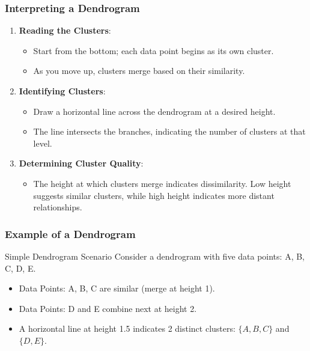 \documentclass[aspectratio=169]{beamer}
\begin{document}
\begin{frame}[fragile]
    \frametitle{Interpreting a Dendrogram}
    \begin{enumerate}
        \item \textbf{Reading the Clusters}:
        \begin{itemize}
            \item Start from the bottom; each data point begins as its own cluster.
            \item As you move up, clusters merge based on their similarity.
        \end{itemize}
        
        \item \textbf{Identifying Clusters}:
        \begin{itemize}
            \item Draw a horizontal line across the dendrogram at a desired height. 
            \item The line intersects the branches, indicating the number of clusters at that level.
        \end{itemize}
        
        \item \textbf{Determining Cluster Quality}:
        \begin{itemize}
            \item The height at which clusters merge indicates dissimilarity. Low height suggests similar clusters, while high height indicates more distant relationships.
        \end{itemize}
    \end{enumerate}
\end{frame}

\begin{frame}[fragile]
    \frametitle{Example of a Dendrogram}
    \begin{block}{Simple Dendrogram Scenario}
        Consider a dendrogram with five data points: A, B, C, D, E.
        \begin{itemize}
            \item Data Points: A, B, C are similar (merge at height 1).
            \item Data Points: D and E combine next at height 2.
            \item A horizontal line at height 1.5 indicates 2 distinct clusters: $\{A, B, C\}$ and $\{D, E\}$.
        \end{itemize}
    \end{block}
\end{frame}
\end{document}
